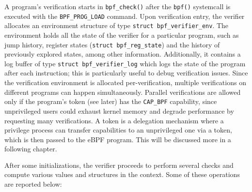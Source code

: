 A program's verification starts in \verb|bpf_check()| after the \verb|bpf()|
systemcall is executed with the \verb|BPF_PROG_LOAD| command. Upon verification
entry, the verifier allocates an environment structure of type \verb|struct bpf_verifier_env|.
The environment holds all the state of the verifier for a
particular program, such as jump history, register states (\verb|struct bpf_reg_state|)
and the history of previously explored states, among other information.
Additionally, it contains a log buffer of type \verb|struct bpf_verifier_log|
which logs the state of the program after each instruction;
this is particularly useful to debug verification issues. Since the verification
environment is allocated per-verification, multiple verifications on different
programs can happen simultaneously. Parallel verifications are allowed only if
the program's token (see later) has the \verb|CAP_BPF| capability, since
unprivileged users could exhaust kernel memory and degrade performance by
requesting many verifications. A token is a delegation mechanism where a
privilege process can transfer capabilities to an unprivileged one via a token,
which is then passed to the eBPF program. This will be discussed more in a
following chapter.

After some initializations, the verifier proceeds to perform several checks and
compute various values and structures in the context. Some of these operations
are reported below:

